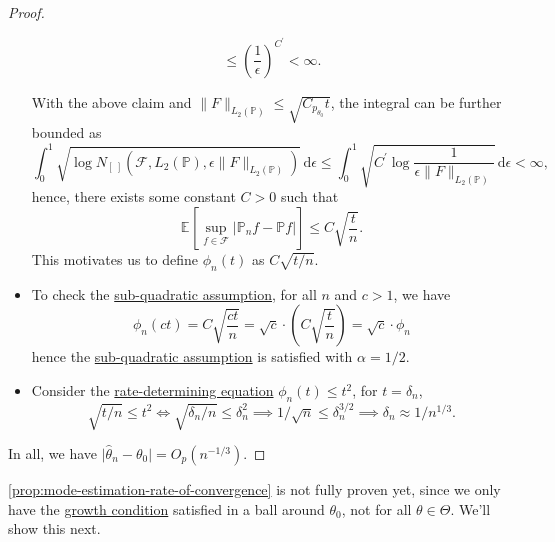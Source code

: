 \begin{proof}
\begin{itemize}
\begin{claim}
\[				      \leq \left( \frac{1}{\epsilon } \right) ^{C^{\prime} } < \infty .
			      \]
		      \end{claim}
		      With the above claim and \(\lVert F \rVert _{L_2(\mathbb{P} )} \leq \sqrt{C_{p_{\theta _0}} t} \), the integral can be further bounded as
		      \[
			      \int_{0}^{1} \sqrt{\log N_{[\ ]}(\mathscr{F} , L_2(\mathbb{P} ), \epsilon \lVert F \rVert _{L_2(\mathbb{P} )})} \,\mathrm{d}\epsilon
			      \leq \int_{0}^{1} \sqrt{C^{\prime} \log \frac{1}{\epsilon \lVert F \rVert _{L_2(\mathbb{P} )}} } \,\mathrm{d}\epsilon
			      < \infty,
		      \]
		      hence, there exists some constant \(C> 0\) such that
		      \[
			      \mathbb{E}_{}\left[\sup _{f\in \mathscr{F} } \vert \mathbb{P} _n f - \mathbb{P} f \vert  \right]
			      \leq C \sqrt{\frac{t}{n}}.
		      \]
		      This motivates us to define \(\phi _n (t)\) as \(C \sqrt{t / n} \).
		\item To check the \hyperref[def:sub-quadratic-assumption]{sub-quadratic assumption}, for all \(n\) and \(c > 1\), we have
		      \[
			      \phi _n (ct)
			      = C \sqrt{\frac{ct}{n}}
			      = \sqrt{c} \cdot \left( C \sqrt{\frac{t}{n}} \right)
			      = \sqrt{c} \cdot \phi _n
		      \]
		      hence the \hyperref[def:sub-quadratic-assumption]{sub-quadratic assumption} is satisfied with \(\alpha = 1 / 2\).
		\item Consider the \hyperref[def:rate-determining-equation]{rate-determining equation} \(\phi _n(t) \leq t^2\), for \(t = \delta _n\),
		      \[
			      \sqrt{t / n} \leq t^2
			      \iff \sqrt{\delta _n / n} \leq \delta _n^2
			      \implies 1 / \sqrt{n} \leq \delta _n^{3 / 2}
			      \implies \delta _n \approx 1 / n^{1 / 3}.
		      \]
	\end{itemize}
	In all, we have \(\vert \hat{\theta} _n - \theta _0 \vert = O_p(n^{-1 / 3})\).
\end{proof}

\autoref{prop:mode-estimation-rate-of-convergence} is not fully proven yet, since we only have the \hyperref[def:growth-condition*]{growth condition} satisfied in a ball around \(\theta _0\), not for all \(\theta \in \Theta \). We'll show this next.